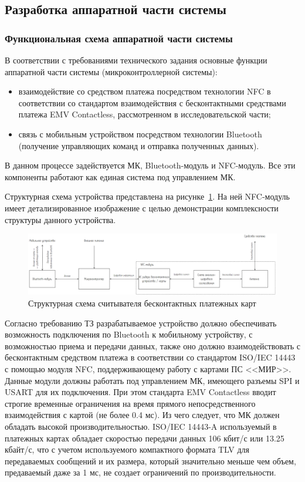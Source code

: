 \subsection{Разработка аппаратной части системы}

\subsubsection{Функциональная схема аппаратной части системы}

В соответствии с требованиями технического задания основные функции аппаратной части системы (микроконтроллерной системы):
\begin{itemize}
    \item взаимодействие со средством платежа посредством технологии NFC в соответствии со стандартом взаимодействия с бесконтактными средствами платежа EMV Contactless, рассмотренном в исследовательской части;
    \item связь с мобильным устройством посредством технологии Bluetooth (получение управляющих команд и отправка полученных данных).
\end{itemize}

В данном процессе задействуется МК, Bluetooth-модуль и NFC-модуль.
Все эти компоненты работают как единая система под управлением МК.

Структурная схема устройства представлена на рисунке~\ref{fig:apparat_struct}.
На ней NFC-модуль имеет детализированное изображение с целью демонстрации комплексности структуры данного устройства.

\begin{figure}[h]
    \centering
    \includegraphics[width=1\textwidth]{images/design/apparat_struct}
    \caption{\centering Структурная схема считывателя бесконтактных платежных карт}
    \label{fig:apparat_struct}
\end{figure}

Согласно требованию ТЗ разрабатываемое устройство должно обеспечивать возможность подключения по Bluetooth к мобильному устройству, с возможностью приема и передачи данных, также оно должно взаимодействовать с бесконтактным средством платежа в соответствии со стандартом ISO/IEC 14443 с помощью модуля NFC, поддерживающему работу с картами ПС <<МИР>>.
Данные модули должны работать под управлением МК, имеющего разъемы SPI и USART для их подключения.
При этом стандарта EMV Contactless вводит строгие временные ограничения на время прямого непосредственного взаимодействия с картой (не более 0.4 мс).
Из чего следует, что МК должен обладать высокой производительностью.
ISO/IEC 14443-A используемый в платежных картах обладает скоростью передачи данных 106 кбит/с или 13.25 кбайт/с, что с учетом используемого компактного формата TLV для передаваемых сообщений и их размера, который значительно меньше чем объем, предаваемый даже за 1 мс, не создает ограничений по производительности.

